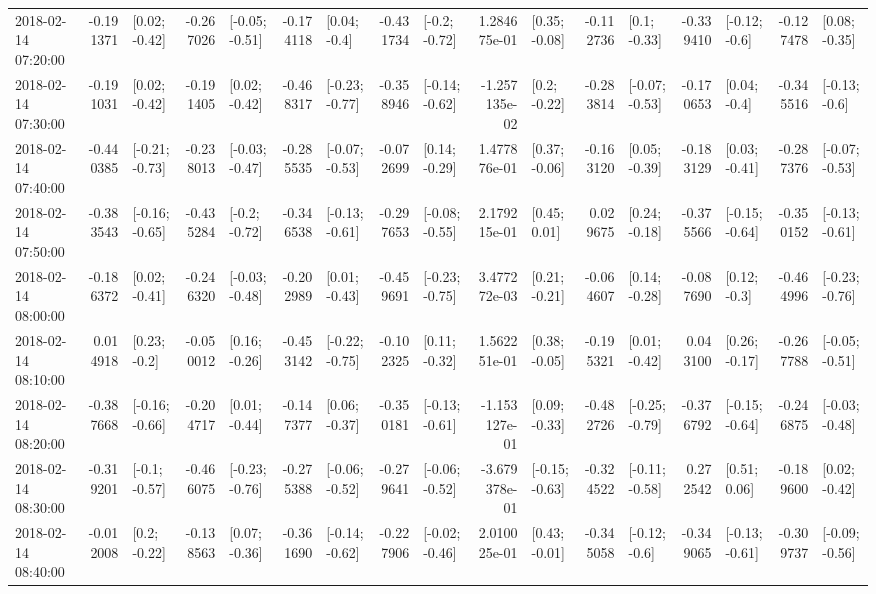 \begin{tabular}{lrlrlrlrlrlrlrlrl}
2018-02-14 07:20:00 & -0.191371 &   [0.02; -0.42] & -0.267026 &  [-0.05; -0.51] & -0.174118 &    [0.04; -0.4] & -0.431734 &   [-0.2; -0.72] &  1.284675e-01 &   [0.35; -0.08] & -0.112736 &    [0.1; -0.33] & -0.339410 &   [-0.12; -0.6] & -0.127478 &   [0.08; -0.35] \\
2018-02-14 07:30:00 & -0.191031 &   [0.02; -0.42] & -0.191405 &   [0.02; -0.42] & -0.468317 &  [-0.23; -0.77] & -0.358946 &  [-0.14; -0.62] & -1.257135e-02 &    [0.2; -0.22] & -0.283814 &  [-0.07; -0.53] & -0.170653 &    [0.04; -0.4] & -0.345516 &   [-0.13; -0.6] \\
2018-02-14 07:40:00 & -0.440385 &  [-0.21; -0.73] & -0.238013 &  [-0.03; -0.47] & -0.285535 &  [-0.07; -0.53] & -0.072699 &   [0.14; -0.29] &  1.477876e-01 &   [0.37; -0.06] & -0.163120 &   [0.05; -0.39] & -0.183129 &   [0.03; -0.41] & -0.287376 &  [-0.07; -0.53] \\
2018-02-14 07:50:00 & -0.383543 &  [-0.16; -0.65] & -0.435284 &   [-0.2; -0.72] & -0.346538 &  [-0.13; -0.61] & -0.297653 &  [-0.08; -0.55] &  2.179215e-01 &    [0.45; 0.01] &  0.029675 &   [0.24; -0.18] & -0.375566 &  [-0.15; -0.64] & -0.350152 &  [-0.13; -0.61] \\
2018-02-14 08:00:00 & -0.186372 &   [0.02; -0.41] & -0.246320 &  [-0.03; -0.48] & -0.202989 &   [0.01; -0.43] & -0.459691 &  [-0.23; -0.75] &  3.477272e-03 &   [0.21; -0.21] & -0.064607 &   [0.14; -0.28] & -0.087690 &    [0.12; -0.3] & -0.464996 &  [-0.23; -0.76] \\
2018-02-14 08:10:00 &  0.014918 &    [0.23; -0.2] & -0.050012 &   [0.16; -0.26] & -0.453142 &  [-0.22; -0.75] & -0.102325 &   [0.11; -0.32] &  1.562251e-01 &   [0.38; -0.05] & -0.195321 &   [0.01; -0.42] &  0.043100 &   [0.26; -0.17] & -0.267788 &  [-0.05; -0.51] \\
2018-02-14 08:20:00 & -0.387668 &  [-0.16; -0.66] & -0.204717 &   [0.01; -0.44] & -0.147377 &   [0.06; -0.37] & -0.350181 &  [-0.13; -0.61] & -1.153127e-01 &   [0.09; -0.33] & -0.482726 &  [-0.25; -0.79] & -0.376792 &  [-0.15; -0.64] & -0.246875 &  [-0.03; -0.48] \\
2018-02-14 08:30:00 & -0.319201 &   [-0.1; -0.57] & -0.466075 &  [-0.23; -0.76] & -0.275388 &  [-0.06; -0.52] & -0.279641 &  [-0.06; -0.52] & -3.679378e-01 &  [-0.15; -0.63] & -0.324522 &  [-0.11; -0.58] &  0.272542 &    [0.51; 0.06] & -0.189600 &   [0.02; -0.42] \\
2018-02-14 08:40:00 & -0.012008 &    [0.2; -0.22] & -0.138563 &   [0.07; -0.36] & -0.361690 &  [-0.14; -0.62] & -0.227906 &  [-0.02; -0.46] &  2.010025e-01 &   [0.43; -0.01] & -0.345058 &   [-0.12; -0.6] & -0.349065 &  [-0.13; -0.61] & -0.309737 &  [-0.09; -0.56] \\

\end{tabular}
